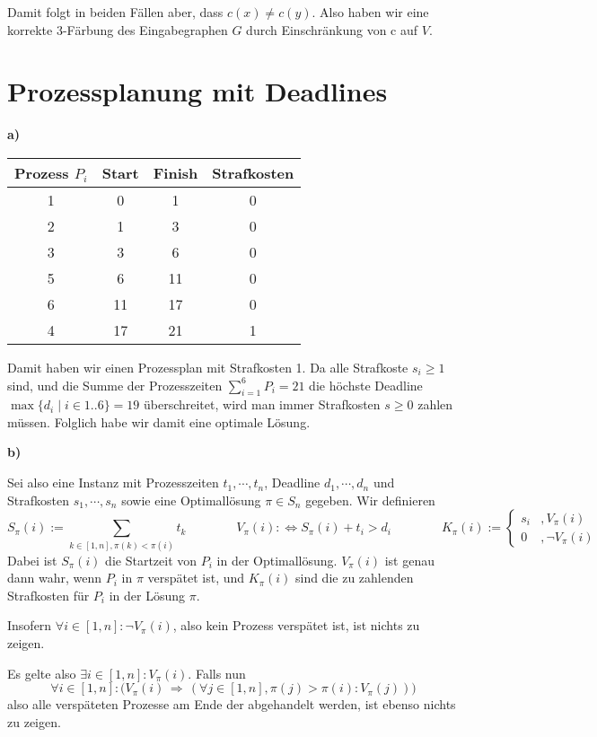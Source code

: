 \documentclass[a4paper,graphics,11pt]{article}
\begin{document}
Damit folgt in beiden Fällen aber, dass $c(x) \neq c(y)$. Also haben wir eine korrekte 3-Färbung des Eingabegraphen $G$
durch Einschränkung von c auf $V$.

\newpage

\section{Prozessplanung mit Deadlines}

\textbf{a)}
\begin{center}
\begin{tabular}{c|c|c|c}
    Prozess $P_i$ & Start & Finish & Strafkosten\\
    \hline
    1   & 0 & 1 & 0\\
    2   & 1 & 3 & 0\\
    3   & 3 & 6 & 0\\
    5   & 6 & 11 & 0\\
    6   & 11 & 17 & 0\\
    4   & 17 & 21 & 1
\end{tabular}
\end{center}
Damit haben wir einen Prozessplan mit Strafkosten 1. Da alle Strafkoste $s_i \geq 1$ sind, und die Summe der Prozesszeiten
$\sum_{i=1}^{6} P_i = 21$ die höchste Deadline $\max\{d_i \mid i \in 1..6\} = 19$ überschreitet, wird man immer
Strafkosten $s \geq 0$ zahlen müssen. Folglich habe wir damit eine optimale Lösung.

\textbf{b)}

Sei also eine Instanz mit Prozesszeiten $t_1,\cdots,t_n$, Deadline $d_1,\cdots,d_n$ und Strafkosten $s_1,\cdots,s_n$
sowie eine Optimallösung $\pi \in S_n$ gegeben. Wir definieren
$$
    S_{\pi}(i) := \sum_{k \in [1,n], \pi(k) < \pi(i)}t_{k}
    \qquad\qquad
    V_\pi(i) :\iff S_\pi(i) + t_i > d_i
    \qquad\qquad
    K_{\pi}(i) := \begin{cases}
        s_i &, V_\pi(i)\\
        0 &, \lnot V_\pi(i)
    \end{cases}
$$
Dabei ist $S_\pi(i)$ die Startzeit von $P_i$ in der Optimallösung. $V_\pi(i)$ ist genau dann wahr, wenn $P_i$ in $\pi$ verspätet ist,
und $K_\pi(i)$ sind die zu zahlenden Strafkosten für $P_i$ in der Lösung $\pi$.

Insofern $\forall i \in [1,n]: \lnot V_\pi(i)$, also kein Prozess verspätet ist, ist nichts zu zeigen.

Es gelte also $\exists i \in [1,n]: V_\pi(i)$. Falls nun
$$
    \forall i \in [1,n]: \bigg(V_\pi(i) \,\Longrightarrow\, (\forall j \in [1,n], \pi(j) > \pi(i): V_\pi(j))\bigg)
$$
also alle verspäteten Prozesse am Ende der abgehandelt werden, ist ebenso nichts zu zeigen.
\end{document}
